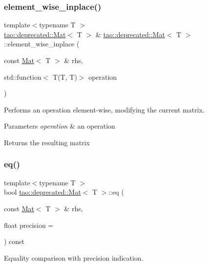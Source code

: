 \subsubsection{\texorpdfstring{element\_wise\_inplace()}{element\_wise\_inplace()}}
{\footnotesize\ttfamily template$<$typename T $>$ \\
\mbox{\hyperlink{classtao_1_1deprecated_1_1_mat}{tao\+::deprecated\+::\+Mat}}$<$ T $>$ \& \mbox{\hyperlink{classtao_1_1deprecated_1_1_mat}{tao\+::deprecated\+::\+Mat}}$<$ T $>$\+::element\+\_\+wise\+\_\+inplace (\begin{DoxyParamCaption}\item[{const \mbox{\hyperlink{classtao_1_1deprecated_1_1_mat}{Mat}}$<$ T $>$ \&}]{rhs,  }\item[{std\+::function$<$ T(T, T)$>$}]{operation }\end{DoxyParamCaption})}



Performs an operation element-\/wise, modifying the current matrix. 


\begin{DoxyParams}{Parameters}
{\em operation} & an operation \\
\hline
\end{DoxyParams}
\begin{DoxyReturn}{Returns}
the resulting matrix 
\end{DoxyReturn}
\mbox{\label{classtao_1_1deprecated_1_1_mat_a2e30a07d0b1989d1360d2a72423885e0}} 
\subsubsection{\texorpdfstring{eq()}{eq()}}
{\footnotesize\ttfamily template$<$typename T $>$ \\
bool \mbox{\hyperlink{classtao_1_1deprecated_1_1_mat}{tao\+::deprecated\+::\+Mat}}$<$ T $>$\+::eq (\begin{DoxyParamCaption}\item[{const \mbox{\hyperlink{classtao_1_1deprecated_1_1_mat}{Mat}}$<$ T $>$ \&}]{rhs,  }\item[{float}]{precision = {} }\end{DoxyParamCaption}) const}



Equality comparison with precision indication. 



